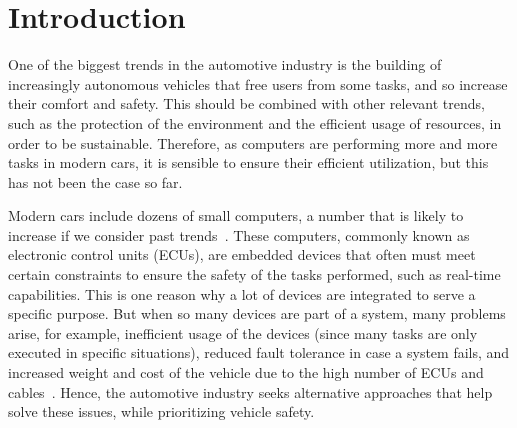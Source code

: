 
\chapter{Introduction}\label{chapter:introduction}
One of the biggest trends in the automotive industry is the building of increasingly autonomous vehicles that free users from some tasks, and so increase their comfort and safety. This should be combined with other relevant trends, such as the protection of the environment and the efficient usage of resources, in order to be sustainable. Therefore, as computers are performing more and more tasks in modern cars, it is sensible to ensure their efficient utilization, but this has not been the case so far.

Modern cars include dozens of small computers, a number that is likely to increase if we consider past trends~\parencite{vipin1, vipin2}. These computers, commonly known as electronic control units (ECUs), are embedded devices that often must meet certain constraints to ensure the safety of the tasks performed, such as real-time capabilities. This is one reason why a lot of devices are integrated to serve a specific purpose. But when so many devices are part of a system, many problems arise, for example, inefficient usage of the devices (since many tasks are only executed in specific situations), reduced fault tolerance in case a system fails, and increased weight and cost of the vehicle due to the high number of ECUs and cables~\parencite{vipin2}. Hence, the automotive industry seeks alternative approaches that help solve these issues, while prioritizing vehicle safety.
 
